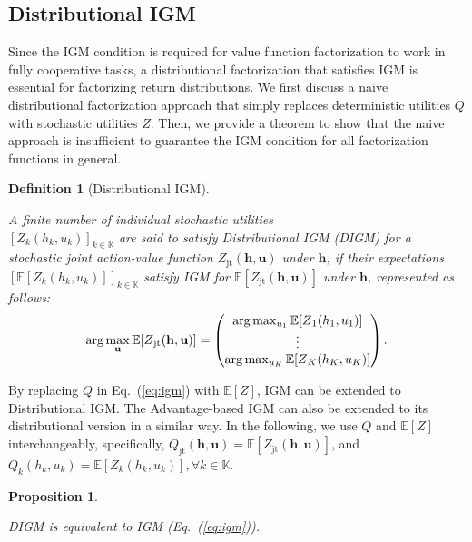 \documentclass[twoside,11pt]{article}
\newcommand{\jointaction}{\mathbf{u}}
\newcommand{\action}{u}
\newcommand{\jointobservationhistory}{\mathbf{h}}
\newcommand{\observationhistory}{h}
\newcommand{\agentspace}{\mathbb{K}}
\newcommand{\agentcounter}{k}
\newcommand{\numberofagents}{K}
\newcommand{\utilityexp}{Q}
\newcommand{\utility}{Z}
\newcommand{\joint}{\mathrm{jt}}
\newcommand{\digm}{DIGM}
\newcounter{theorem0}
\newcounter{proposition0}
\newcounter{definition0}
\newtheorem{proposition}[proposition0]{Proposition}
\newtheorem{definition}[definition0]{Definition}
\begin{document}
\subsection{Distributional IGM}
\label{subsec:methodology_distributional_igm_condition}

Since the IGM condition is required for value function factorization to  work in fully cooperative tasks, a distributional factorization that satisfies IGM is essential for factorizing return distributions. We first discuss a naive distributional factorization approach that simply replaces deterministic utilities $\utilityexp$ with stochastic utilities $\utility$. Then, we provide a theorem to show that the naive approach is insufficient to guarantee the IGM condition for all factorization functions in general.
\begin{definition}[Distributional IGM]
\label{def:distributional_igm}

A finite number of individual stochastic utilities\\ $[\utility_{\agentcounter}(\observationhistory_{\agentcounter}, \action_{\agentcounter})]_{\agentcounter \in \agentspace}$ are said to satisfy Distributional IGM (\digm{}) for a stochastic joint action-value function $\utility_{\joint}(\jointobservationhistory, \jointaction{})$ under $\jointobservationhistory$, if their expectations $[\mathbb{E}[\utility_{\agentcounter}(\observationhistory_{\agentcounter}, u_{\agentcounter})]]_{\agentcounter \in \agentspace}$ satisfy IGM for $\mathbb{E}[\utility_{\joint}(\jointobservationhistory, \jointaction{})]$ under $\jointobservationhistory$, represented as follows:
\begin{equation}
\arg\max_\jointaction{} \mathbb{E}[\utility{}_{\joint{}}(\jointobservationhistory{},\jointaction{})] =
\begin{pmatrix}
\arg\max_{\action{}_1} \mathbb{E}[\utility{}_1(\observationhistory{}_1,\action{}_1)]\\
\vdots \\
\arg\max_{\action{}_\numberofagents{}} \mathbb{E}[\utility{}_\numberofagents{}(\observationhistory{}_\numberofagents{},\action{}_\numberofagents{})]
\end{pmatrix}.
\notag{}
\end{equation}
\end{definition} By replacing $\utilityexp$ in Eq.~(\ref{eq:igm}) with $\mathbb{E}[\utility]$, IGM can be extended to Distributional IGM. The Advantage-based IGM can also be extended to its distributional version in a similar way. In the following, we use $\utilityexp$ and $\mathbb{E}[\utility]$ interchangeably, specifically, $\utilityexp_{\joint{}}(\jointobservationhistory{},\jointaction{}) = \mathbb{E}[\utility_{\joint{}}(\jointobservationhistory{},\jointaction{})]$, and $\utilityexp_{\agentcounter}(\observationhistory_{\agentcounter}, u_{\agentcounter}) = \mathbb{E}[\utility_{\agentcounter}(\observationhistory_{\agentcounter}, u_{\agentcounter})], \forall\agentcounter \in \agentspace$.
\begin{proposition}
\label{prop:digm_equals_igm}

\digm{} is equivalent to IGM (Eq.~(\ref{eq:igm})).
\end{proposition}
\end{document}
